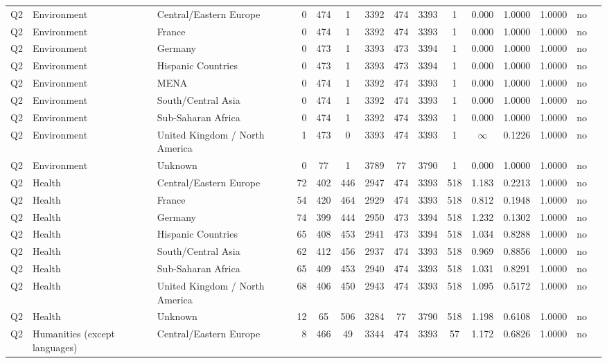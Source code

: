 \begin{longtable}{lllrcccccccccll}
Q2 & Environment & Central/Eastern Europe & 0 & 474 & 1 & 3392 & 474 & 3393 & 1 & 0.000 & 1.0000 & 1.0000 & no \\
Q2 & Environment & France & 0 & 474 & 1 & 3392 & 474 & 3393 & 1 & 0.000 & 1.0000 & 1.0000 & no \\
Q2 & Environment & Germany & 0 & 473 & 1 & 3393 & 473 & 3394 & 1 & 0.000 & 1.0000 & 1.0000 & no \\
Q2 & Environment & Hispanic Countries & 0 & 473 & 1 & 3393 & 473 & 3394 & 1 & 0.000 & 1.0000 & 1.0000 & no \\
Q2 & Environment & MENA & 0 & 474 & 1 & 3392 & 474 & 3393 & 1 & 0.000 & 1.0000 & 1.0000 & no \\
Q2 & Environment & South/Central Asia & 0 & 474 & 1 & 3392 & 474 & 3393 & 1 & 0.000 & 1.0000 & 1.0000 & no \\
Q2 & Environment & Sub-Saharan Africa & 0 & 474 & 1 & 3392 & 474 & 3393 & 1 & 0.000 & 1.0000 & 1.0000 & no \\
Q2 & Environment & United Kingdom / North America & 1 & 473 & 0 & 3393 & 474 & 3393 & 1 & $\infty$ & 0.1226 & 1.0000 & no \\
Q2 & Environment & Unknown & 0 & 77 & 1 & 3789 & 77 & 3790 & 1 & 0.000 & 1.0000 & 1.0000 & no \\
Q2 & Health & Central/Eastern Europe & 72 & 402 & 446 & 2947 & 474 & 3393 & 518 & 1.183 & 0.2213 & 1.0000 & no \\
Q2 & Health & France & 54 & 420 & 464 & 2929 & 474 & 3393 & 518 & 0.812 & 0.1948 & 1.0000 & no \\
Q2 & Health & Germany & 74 & 399 & 444 & 2950 & 473 & 3394 & 518 & 1.232 & 0.1302 & 1.0000 & no \\
Q2 & Health & Hispanic Countries & 65 & 408 & 453 & 2941 & 473 & 3394 & 518 & 1.034 & 0.8288 & 1.0000 & no \\
Q2 & Health & South/Central Asia & 62 & 412 & 456 & 2937 & 474 & 3393 & 518 & 0.969 & 0.8856 & 1.0000 & no \\
Q2 & Health & Sub-Saharan Africa & 65 & 409 & 453 & 2940 & 474 & 3393 & 518 & 1.031 & 0.8291 & 1.0000 & no \\
Q2 & Health & United Kingdom / North America & 68 & 406 & 450 & 2943 & 474 & 3393 & 518 & 1.095 & 0.5172 & 1.0000 & no \\
Q2 & Health & Unknown & 12 & 65 & 506 & 3284 & 77 & 3790 & 518 & 1.198 & 0.6108 & 1.0000 & no \\
Q2 & Humanities (except languages) & Central/Eastern Europe & 8 & 466 & 49 & 3344 & 474 & 3393 & 57 & 1.172 & 0.6826 & 1.0000 & no \\

\end{longtable}
